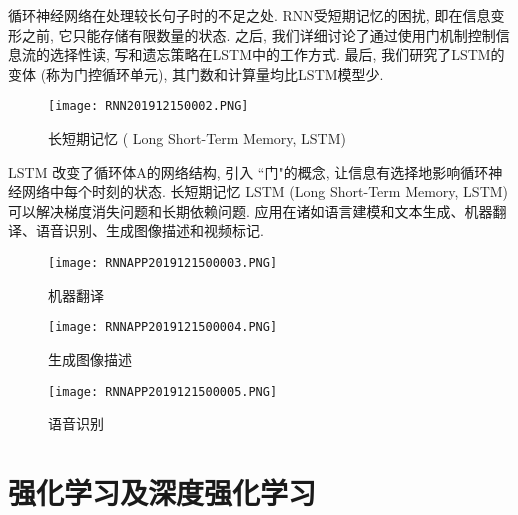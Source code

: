 循环神经网络在处理较长句子时的不足之处. RNN受短期记忆的困扰, 即在信息变形之前, 它只能存储有限数量的状态.
之后, 我们详细讨论了通过使用门机制控制信息流的选择性读, 写和遗忘策略在LSTM中的工作方式. 最后, 我们研究了LSTM的变体 (称为门控循环单元), 其门数和计算量均比LSTM模型少.
\begin{figure}[H]
    \centering
    \texttt{[image: RNN201912150002.PNG]}
    \caption{长短期记忆 ( Long Short-Term Memory, LSTM)}
    \label{RNN201912150002}
    \vspace{-0.4cm}
\end{figure}
LSTM 改变了循环体A的网络结构, 引入 ``门"的概念, 让信息有选择地影响循环神经网络中每个时刻的状态.
长短期记忆 LSTM (Long Short-Term Memory, LSTM)可以解决梯度消失问题和长期依赖问题.
应用在诸如语言建模和文本生成、机器翻译、语音识别、生成图像描述和视频标记.
\begin{figure}[H]
    \centering
    \texttt{[image: RNNAPP2019121500003.PNG]}
    \caption{机器翻译}
    \label{RNNAPP2019121500003}
    \vspace{-0.4cm}
\end{figure}
\begin{figure}[H]
    \centering
    \texttt{[image: RNNAPP2019121500004.PNG]}
    \caption{生成图像描述}
    \label{RNNAPP2019121500005}
    \vspace{-0.4cm}
\end{figure}
\begin{figure}[H]
    \centering
    \texttt{[image: RNNAPP2019121500005.PNG]}
    \caption{语音识别}
    \label{RNNAPP2019121500005}
    \vspace{-0.4cm}
\end{figure}
\section{强化学习及深度强化学习}

